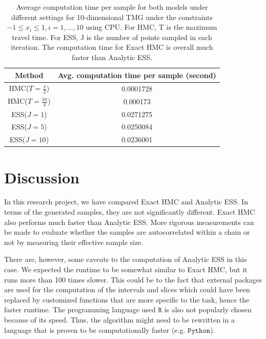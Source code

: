 \documentclass{scrartcl}
\numberwithin{equation}{section}
\begin{document}
\begin{table}
\centering
\begin{tabular}{|c|c|}
	\hline
	Method & Avg. computation time per sample (second) \\
	\hline
	HMC($T=\frac{\pi}{2}$) & 0.0001728 \\
	\hline
	HMC($T=\frac{3\pi}{4}$) & 0.000173 \\
	\hline
	ESS($J=1$) & 0.0271275 \\
	\hline
	ESS($J=5$) & 0.0250084 \\
	\hline
	ESS($J=10$) & 0.0236001 \\
	\hline
\end{tabular}
\caption{Average computation time per sample for both models under different settings for 10-dimensional TMG under the constraints $-1 \leq x_i \leq 1, i=1,...,10$ using CPU. For HMC, T is the maximum travel time. For ESS, J is the number of points sampled in each iteration. The computation time for Exact HMC is overall much faster than Analytic ESS.}
\end{table}


\section{Discussion}
In this research project, we have compared Exact HMC and Analytic ESS. In terms of the generated samples, they are not significantly different. Exact HMC also performs much faster than Analytic ESS. More rigorous measurements can be made to evaluate whether the samples are autocorrelated within a chain or not by measuring their effective sample size.     

There are, however, some caveats to the computation of Analytic ESS in this case. We expected the runtime to be somewhat similar to Exact HMC, but it runs more than 100 times slower. This could be to the fact that external packages are used for the computation of the intervals and slices which could have been replaced by customized functions that are more specific to the task, hence the faster runtime. The programming language used $\texttt{R}$ is also not popularly chosen because of its speed. Thus, the algorithm might need to be rewritten in a language that is proven to be computationally faster (e.g. $\texttt{Python}$).   


\newpage

\end{document}

